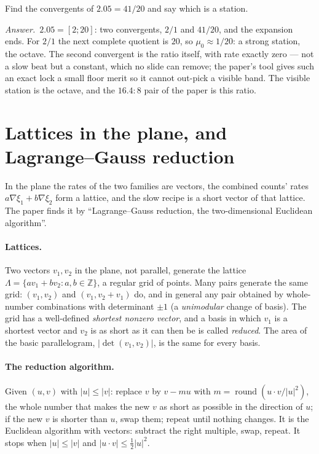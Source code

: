 \documentclass[10pt]{article}
\theoremstyle{plain}
\theoremstyle{definition}
\newcommand{\answer}{\par\smallskip\noindent\textit{Answer.}\ }
\newcommand{\Z}{\mathbb{Z}}
\newcommand{\cnt}{\xi}
\begin{document}
\begin{checkyourself}
Find the convergents of $2.05=41/20$ and say which is a station.
\answer $2.05=[2;20]$: two convergents, $2/1$ and $41/20$, and the expansion
ends. For $2/1$ the next complete quotient is $20$, so $\mu_0\approx1/20$: a
strong station, the octave. The second convergent is the ratio itself, with
rate exactly zero --- not a slow beat but a constant, which no slide can
remove; the paper's tool gives such an exact lock a small floor merit so it
cannot out-pick a visible band. The visible station is the octave, and the
$16.4{:}8$ pair of the paper is this ratio.
\end{checkyourself}

\section{Lattices in the plane, and Lagrange--Gauss reduction}
\label{p:lattice}

\begin{why}
In the plane the rates of the two families are vectors, the combined
counts' rates $a\nabla\cnt_1+b\nabla\cnt_2$ form a lattice, and the slow
recipe is a short vector of that lattice. The paper finds it by
``Lagrange--Gauss reduction, the two-dimensional Euclidean algorithm''.
\end{why}

\paragraph{Lattices.}
Two vectors $v_1,v_2$ in the plane, not parallel, generate the lattice
$\Lambda=\{av_1+bv_2:a,b\in\Z\}$, a regular grid of points. Many pairs
generate the same grid: $(v_1,v_2)$ and $(v_1,v_2+v_1)$ do, and in general
any pair obtained by whole-number combinations with determinant $\pm1$
(a \emph{unimodular} change of basis). The grid has a well-defined
\emph{shortest nonzero vector}, and a basis in which $v_1$ is a shortest
vector and $v_2$ is as short as it can then be is called \emph{reduced}.
The area of the basic parallelogram, $|\det(v_1,v_2)|$, is the same for
every basis.

\paragraph{The reduction algorithm.}
Given $(u,v)$ with $|u|\le|v|$: replace $v$ by $v-mu$ with
$m=\operatorname{round}(u\cdot v/|u|^2)$, the whole number that makes the
new $v$ as short as possible in the direction of $u$; if the new $v$ is
shorter than $u$, swap them; repeat until nothing changes. It is the
Euclidean algorithm with vectors: subtract the right multiple, swap,
repeat. It stops when $|u|\le|v|$ and $|u\cdot v|\le\tfrac12|u|^2$.
\end{document}
